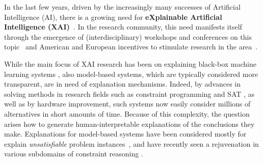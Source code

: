 

In the last few years, driven by the increasingly many successes of Artificial Intelligence (AI), there is a growing need for \textbf{eXplainable Artificial Intelligence (XAI)}~\cite{miller2019explanation}.
In the research community, this need manifests itself through the emergence of (interdisciplinary) workshops and conferences on this topic~\cite{xai-ijcai,FAT} and American and European incentives to stimulate research in the area~\cite{gunning2017explainable,hamonrobustness,fetproact}. 

While the main focus of XAI research has been on explaining black-box machine learning systems \cite{lundberg2017unified,guidotti2018survey,ignatiev2019abduction}, also model-based systems, which are typically considered more transparent, are in need of explanation mechanisms. 
Indeed, by advances in solving methods in research fields such as constraint programming \cite{fai/Rossi06} and SAT \cite{faia/2009-185}, as well as by hardware improvement, such systems now easily consider millions of alternatives in short amounts of time. 
Because of this complexity, the question arises how to generate human-interpretable explanations of the conclusions they make. 
Explanations for model-based systems have been considered mostly for explain \textit{unsatisfiable} problem instances~\cite{junker2001quickxplain}, and have recently seen a rejuvenation in various subdomains of constraint reasoning \cite{fox2017explainable,vcyras2019argumentation,chakraborti2017plan,ecai/BogaertsGCG20}.

